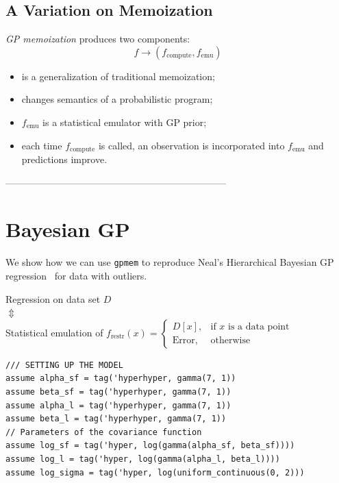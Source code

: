 \documentclass[a0,portrait]{a0poster}
\newcommand{\compute}{{\textrm{compute}}}
\newcommand{\emu}{{\textrm{emu}}}
\newcommand{\restr}{{\textrm{restr}}}
\begin{document}
\begin{multicols}{3}
\subsection*{A Variation on Memoization}
{\em GP memoization} produces two components:
\[ f \to (f_\compute, f_\emu) \]
\begin{itemize}
\setlength{\itemindent}{1cm}
 \item is a generalization of traditional memoization;
 \item changes semantics of a probabilistic program;
 \item $f_\emu$ is a statistical emulator with GP prior;
 \item each time $f_\compute$ is called, an observation is incorporated into $f_\emu$ and predictions improve.
\end{itemize}


---------------------------------------------------------------------


\section*{Bayesian GP}

We show how we can use  {\tt gpmem} to reproduce Neal's Hierarchical Bayesian GP regression~\cite{neal1997monte} for data with outliers.

\begin{center}
Regression on data set $D$ \\
$\Updownarrow$ \\
Statistical emulation of $f_\restr(x) = \begin{cases}
      D[x], & \text{if $x$ is a data point} \\
      \text{Error}, & \text{otherwise}
    \end{cases}$
\end{center}
\begin{minipage}{\linewidth}
\belowcaptionskip=-10pt
\begin{lstlisting}[frame=single,caption=Hierarchical  GP Smoothing,mathescape,label=alg:gphierarch]
/// SETTING UP THE MODEL
assume alpha_sf = tag('hyperhyper, gamma(7, 1))
assume beta_sf = tag('hyperhyper, gamma(7, 1))
assume alpha_l = tag('hyperhyper, gamma(7, 1))
assume beta_l = tag('hyperhyper, gamma(7, 1))
// Parameters of the covariance function
assume log_sf = tag('hyper, log(gamma(alpha_sf, beta_sf))))
assume log_l = tag('hyper, log(gamma(alpha_l, beta_l))))
assume log_sigma = tag('hyper, log(uniform_continuous(0, 2)))


\end{lstlisting}
\end{minipage}
\end{multicols}
\end{document}
